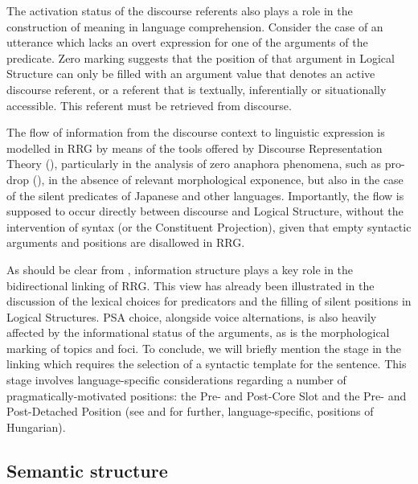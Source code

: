 \documentclass[output=paper,hidelinks]{langscibook}
\begin{document}
  The activation status of the discourse referents also plays a role in the construction of meaning in language comprehension. Consider the case of an utterance which lacks an overt expression for one of the arguments of the predicate. Zero marking suggests that the position of that argument in Logical Structure can only be filled with an argument value that denotes an active discourse referent, or a referent that is textually, inferentially or situationally accessible. This referent must be retrieved from discourse.

\largerpage[-2]
  The flow of information from the discourse context to linguistic expression is modelled in RRG by means of the tools offered by Discourse Representation Theory (\citealt{KampReyle1993}), particularly in the analysis of zero anaphora phenomena, such as pro-drop (), in the absence of relevant morphological exponence, but also in the case of the silent predicates of Japanese and other languages. Importantly, the flow is supposed to occur directly between discourse and Logical Structure, without the intervention of syntax (or the Constituent Projection), given that empty syntactic arguments and positions are disallowed in RRG.

  As should be clear from , information structure plays a key role in the bidirectional linking of RRG. This view has already been illustrated in the discussion of the lexical choices for predicators and the filling of silent positions in Logical Structures. PSA choice, alongside voice alternations, is also heavily affected by the informational status of the arguments, as is the morphological marking of topics and foci. To conclude, we will briefly mention the stage in the linking which requires the selection of a syntactic template for the sentence. This stage involves language-specific considerations regarding a number of pragmatically-motivated positions: the Pre- and Post-Core Slot and the Pre- and Post-Detached Position (see  and \citealt{Balogh2021b} for further, lan\-guage-specific, positions of Hungarian).

\subsection{Semantic structure}
\label{sec:RRG:3.7}
\end{document}
